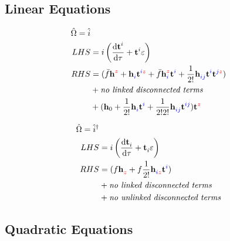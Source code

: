 \documentclass{article}
\newcommand{\bh}{\textbf{h}}
\newcommand{\bt}{\textbf{t}}
\newcommand{\up}[1]{\hat{#1}^{\dagger}}
\newcommand{\down}[1]{\hat{#1}}
\begin{document}
%
%
%
%
%

\subsection{Linear Equations}

\begin{align}\begin{split}
    \hat{\Omega} = \down{i}
\\ LHS &=
    i\left(\dv{\bt^{i}_{}}{\tau} + \bt^{i}_{}\varepsilon\right)
\\ RHS &=
%
%
(\bar{f}\bh^{\blue{}\red{z}}_{\blue{}\red{}} + \bh^{\blue{}\red{}}_{\blue{i}\red{}}\bt^{\blue{i}\red{z}} + \bar{f}\bh^{\blue{}\red{z}}_{\blue{i}\red{}}\bt^{\blue{i}\red{}} + \frac{1}{2!}\bh^{\blue{}\red{}}_{\blue{ij}\red{}}\bt^{\blue{i}\red{}}\bt^{\blue{j}\red{z}})
%
%
\\  &+
%
%
    \textit{no linked disconnected terms}
%
%
\\  &+
%
%
(\bh_0 + \frac{1}{2!}\bh^{\blue{}\red{}}_{\blue{i}\red{}}\bt^{\blue{i}\red{}} + \frac{1}{2!2!}\bh^{\blue{}\red{}}_{\blue{ij}\red{}}\bt^{\blue{ij}\red{}})\bt^{\blue{}\red{z}}
\end{split}\end{align}

%
%
%
%
%

\begin{align}\begin{split}
    \hat{\Omega} = \up{i}
\\ LHS &=
    i\left(\dv{\bt^{}_{i}}{\tau} + \bt^{}_{i}\varepsilon\right)
\\ RHS &=
%
%
(f\bh^{\blue{}\red{}}_{\blue{}\red{z}} + f\frac{1}{2!}\bh^{\blue{}\red{}}_{\blue{i}\red{z}}\bt^{\blue{i}\red{}})
%
%
\\  &+
%
%
    \textit{no linked disconnected terms}
%
%
\\  &+
%
%
    \textit{no unlinked disconnected terms}
\end{split}\end{align}

%
%
%
%
%

\newpage
\subsection{Quadratic Equations}
\end{document}
